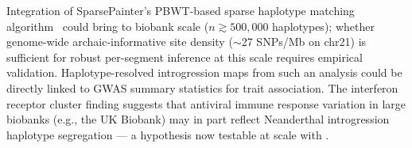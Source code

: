 Integration of SparsePainter's PBWT-based sparse haplotype matching
algorithm~\citep{yang2025sparsepainter} could bring \AP{} to biobank scale
($n \gtrsim 500{,}000$ haplotypes); whether genome-wide archaic-informative
site density ($\sim$27 SNPs/Mb on chr21) is sufficient for robust per-segment
inference at this scale requires empirical validation.
Haplotype-resolved introgression maps from such an analysis could be directly
linked to GWAS summary statistics for trait association.
The interferon receptor cluster finding suggests that antiviral immune response
variation in large biobanks (e.g., the UK Biobank) may in part reflect
Neanderthal introgression haplotype segregation --- a hypothesis now testable
at scale with \AP{}.
